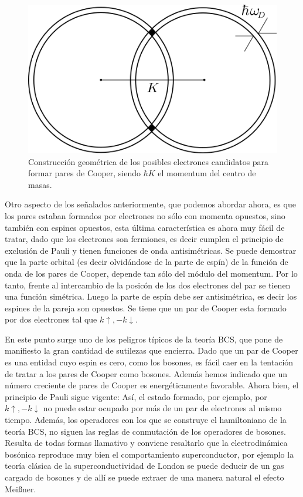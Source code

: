\begin{figure}[H]
\centering \includegraphics[width=0.6\linewidth]{img/goodcooper.png}
\caption{Construcción geométrica de los posibles electrones candidatos para formar pares de Cooper, siendo $\hbar K$ el momentum del centro de masas.}
\label{fig:goodcooper}
\end{figure}

Otro aspecto de los señalados anteriormente, que podemos abordar ahora, es que los pares estaban formados por electrones no sólo con momenta opuestos, sino también con espines opuestos, esta última característica es ahora muy fácil de tratar, dado que los electrones son fermiones, es decir cumplen el principio de exclusión de Pauli y tienen funciones de onda antisimétricas. Se puede demostrar que la parte orbital (es decir olvidándose de la parte de espín) de la función de onda de los pares de Cooper, depende tan sólo del módulo del momentum. Por lo tanto, frente al intercambio de la posicón de los dos electrones del par se tienen una función simétrica. Luego la parte de espín debe ser antisimétrica, es decir los espines de la pareja son opuestos. Se tiene que un par de Cooper esta formado por dos electrones tal que $k \uparrow, -k \downarrow$.

En este punto surge uno de los peligros típicos de la teoría BCS, que pone de manifiesto la gran cantidad de sutilezas que encierra. Dado que un par de Cooper es una entidad cuyo espin es cero, como los bosones, es fácil caer en la tentación de tratar a los pares de Cooper como bosones. Además hemos indicado que un número creciente de pares de Cooper es energéticamente favorable. Ahora bien, el principio de Pauli sigue vigente: Así, el estado formado, por ejemplo, por $k \uparrow, -k \downarrow$ no puede estar ocupado por más de un par de electrones al mismo tiempo. Además, los operadores con los que se construye el hamiltoniano de la teoría BCS, no siguen las reglas de conmutación de los operadores de bosones. Resulta de todas formas llamativo y conviene resaltarlo que la electrodinámica bosónica reproduce muy bien el comportamiento superconductor, por ejemplo la teoría clásica de la superconductividad de London se puede deducir de un gas cargado de bosones y de allí se puede extraer de una manera natural el efecto Meißner.

